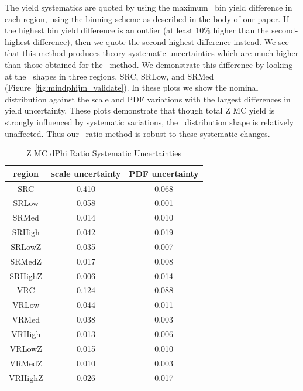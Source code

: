 The yield systematics are quoted by using the maximum \mll\ bin yield difference in each region, using the binning scheme as described in the body of our paper. If the highest bin yield difference is an outlier (at least $10\%$ higher than the second-highest difference), then we quote the second-highest difference instead. We see that this method produces theory systematic uncertainties which are much higher than those obtained for the \mindphijm\ method. We demonstrate this difference by looking at the \mindphijm\ shapes in three regions, SRC, SRLow, and SRMed (Figure~\ref{fig:mindphijm_validate}). In these plots we show the nominal \mindphijm distribution against the scale and PDF variations with the largest differences in yield uncertainty. These plots demonstrate that though total Z MC yield is strongly influenced by systematic variations, the \mindphijm\ distribution shape is relatively unaffected. Thus our \mindphijm\ ratio method is robust to these systematic changes.

\begin{table}[htbp]
\caption{Z MC dPhi Ratio Systematic Uncertainties}
\begin{center}
\begin{tabular}{c|c|c}
region & scale uncertainty & PDF uncertainty \\
\hline
SRC & 0.410 & 0.068 \\
SRLow & 0.058 & 0.001 \\
SRMed & 0.014 & 0.010 \\
SRHigh & 0.042 & 0.019 \\
SRLowZ & 0.035 & 0.007 \\
SRMedZ & 0.017 & 0.008 \\
SRHighZ & 0.006 & 0.014 \\
VRC & 0.124 & 0.088 \\
VRLow & 0.044 & 0.011 \\
VRMed & 0.038 & 0.003 \\
VRHigh & 0.013 & 0.006 \\
VRLowZ & 0.015 & 0.010 \\
VRMedZ & 0.010 & 0.003 \\
VRHighZ & 0.026 & 0.017 \\
\end{tabular}
\end{center}
\label{tab:ZMC_ratio_systematics_rep} 
\end{table}

